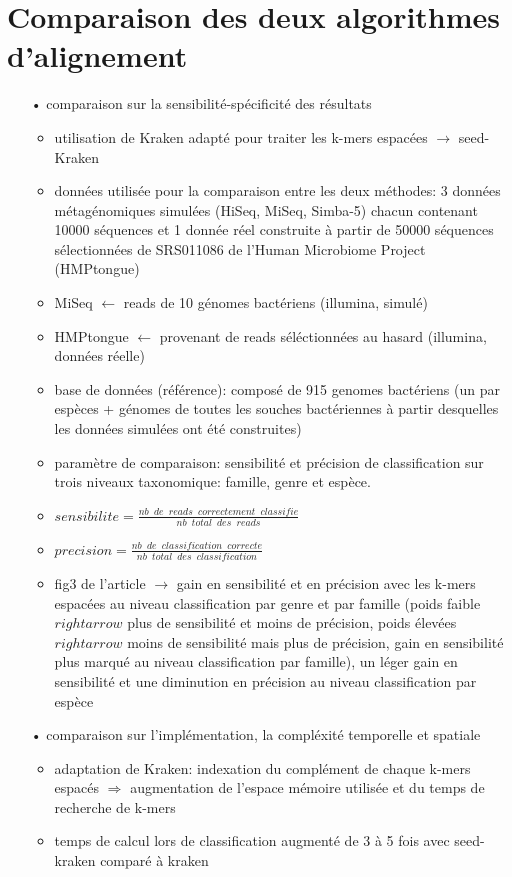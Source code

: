 \section{Comparaison des deux algorithmes d'alignement}

	\begin{itemize}
        \item[•] comparaison sur la sensibilité-spécificité des résultats
          \begin{itemize}
          \item utilisation de Kraken \cite{Wood2014} adapté pour traiter les k-mers espacées $\rightarrow$ seed-Kraken
          \item données utilisée pour la comparaison entre les deux méthodes: 3 données métagénomiques simulées (HiSeq, MiSeq, Simba-5) chacun contenant 10000 séquences et 1 donnée réel construite à partir de 50000 séquences sélectionnées de SRS011086 de l'Human Microbiome Project (HMPtongue)
          \item MiSeq $\leftarrow$ reads de 10 génomes bactériens (illumina, simulé)
          \item HMPtongue $\leftarrow$ provenant de reads séléctionnées au hasard (illumina, données réelle)
          \item base de données (référence): composé de 915 genomes bactériens (un par espèces + génomes de toutes les souches bactériennes à partir desquelles les données simulées ont été construites)
          \item paramètre de comparaison: sensibilité et précision de classification sur trois niveaux taxonomique: famille, genre et espèce.
          \item $sensibilite=\frac{nb \phantom{a} de \phantom{a} reads \phantom{a} correctement \phantom{a} classifie}{nb \phantom{a} total \phantom{a} des \phantom{a} reads}$
          \item $precision=\frac{nb \phantom{a} de \phantom{a} classification \phantom{a} correcte}{nb \phantom{a} total \phantom{a} des \phantom{a} classification}$
          \item fig3 de l'article $\rightarrow$ gain en sensibilité et en précision avec les k-mers espacées au niveau classification par genre et par famille (poids faible $rightarrow$ plus de sensibilité et moins de précision, poids élevées $rightarrow$ moins de sensibilité mais plus de précision, gain en sensibilité plus marqué au niveau classification par famille), un léger gain en sensibilité et une diminution en précision au niveau classification par espèce
          \end{itemize}
        \item[•] comparaison sur l'implémentation, la compléxité temporelle et spatiale
          \begin{itemize}
          \item adaptation de Kraken: indexation du complément de chaque k-mers espacés $\Rightarrow$ augmentation de l'espace mémoire utilisée et du temps de recherche de k-mers
          \item temps de calcul lors de classification augmenté de 3 à 5 fois avec seed-kraken comparé à kraken
          \end{itemize} 
	\end{itemize}
